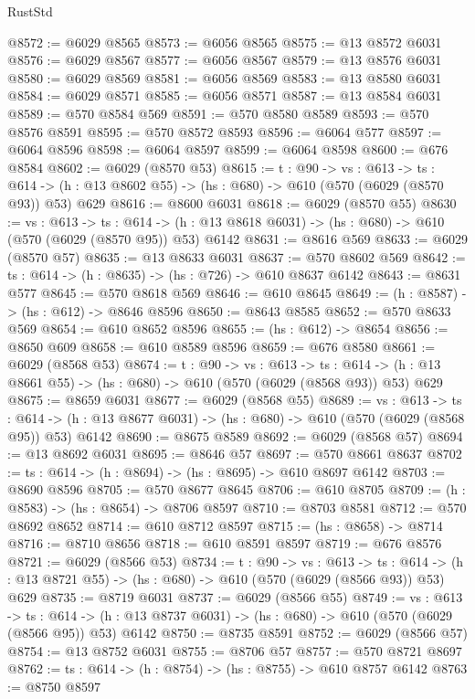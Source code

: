 \begin{lexlean}{RustStd}
\begin{coremodule}
@8572 := @6029 @8565
@8573 := @6056 @8565
@8575 := @13 @8572 @6031
@8576 := @6029 @8567
@8577 := @6056 @8567
@8579 := @13 @8576 @6031
@8580 := @6029 @8569
@8581 := @6056 @8569
@8583 := @13 @8580 @6031
@8584 := @6029 @8571
@8585 := @6056 @8571
@8587 := @13 @8584 @6031
@8589 := @570 @8584 @569
@8591 := @570 @8580 @8589
@8593 := @570 @8576 @8591
@8595 := @570 @8572 @8593
@8596 := @6064 @577
@8597 := @6064 @8596
@8598 := @6064 @8597
@8599 := @6064 @8598
@8600 := @676 @8584
@8602 := @6029 (@8570 @53)
@8615 := {t : @90} ->
  {vs : @613} ->
  {ts : @614} -> (h : @13 @8602 @55) -> (hs : @680) -> @610 (@570 (@6029 (@8570 @93)) @53) @629
@8616 := @8600 @6031
@8618 := @6029 (@8570 @55)
@8630 := {vs : @613} ->
  {ts : @614} -> (h : @13 @8618 @6031) -> (hs : @680) -> @610 (@570 (@6029 (@8570 @95)) @53) @6142
@8631 := @8616 @569
@8633 := @6029 (@8570 @57)
@8635 := @13 @8633 @6031
@8637 := @570 @8602 @569
@8642 := {ts : @614} -> (h : @8635) -> (hs : @726) -> @610 @8637 @6142
@8643 := @8631 @577
@8645 := @570 @8618 @569
@8646 := @610 @8645
@8649 := (h : @8587) -> (hs : @612) -> @8646 @8596
@8650 := @8643 @8585
@8652 := @570 @8633 @569
@8654 := @610 @8652 @8596
@8655 := (hs : @612) -> @8654
@8656 := @8650 @609
@8658 := @610 @8589 @8596
@8659 := @676 @8580
@8661 := @6029 (@8568 @53)
@8674 := {t : @90} ->
  {vs : @613} ->
  {ts : @614} -> (h : @13 @8661 @55) -> (hs : @680) -> @610 (@570 (@6029 (@8568 @93)) @53) @629
@8675 := @8659 @6031
@8677 := @6029 (@8568 @55)
@8689 := {vs : @613} ->
  {ts : @614} -> (h : @13 @8677 @6031) -> (hs : @680) -> @610 (@570 (@6029 (@8568 @95)) @53) @6142
@8690 := @8675 @8589
@8692 := @6029 (@8568 @57)
@8694 := @13 @8692 @6031
@8695 := @8646 @57
@8697 := @570 @8661 @8637
@8702 := {ts : @614} -> (h : @8694) -> (hs : @8695) -> @610 @8697 @6142
@8703 := @8690 @8596
@8705 := @570 @8677 @8645
@8706 := @610 @8705
@8709 := (h : @8583) -> (hs : @8654) -> @8706 @8597
@8710 := @8703 @8581
@8712 := @570 @8692 @8652
@8714 := @610 @8712 @8597
@8715 := (hs : @8658) -> @8714
@8716 := @8710 @8656
@8718 := @610 @8591 @8597
@8719 := @676 @8576
@8721 := @6029 (@8566 @53)
@8734 := {t : @90} ->
  {vs : @613} ->
  {ts : @614} -> (h : @13 @8721 @55) -> (hs : @680) -> @610 (@570 (@6029 (@8566 @93)) @53) @629
@8735 := @8719 @6031
@8737 := @6029 (@8566 @55)
@8749 := {vs : @613} ->
  {ts : @614} -> (h : @13 @8737 @6031) -> (hs : @680) -> @610 (@570 (@6029 (@8566 @95)) @53) @6142
@8750 := @8735 @8591
@8752 := @6029 (@8566 @57)
@8754 := @13 @8752 @6031
@8755 := @8706 @57
@8757 := @570 @8721 @8697
@8762 := {ts : @614} -> (h : @8754) -> (hs : @8755) -> @610 @8757 @6142
@8763 := @8750 @8597

\end{coremodule}
\end{lexlean}
